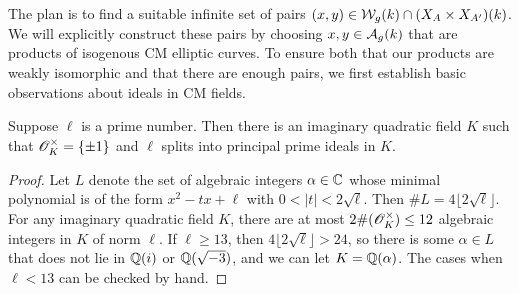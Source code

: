 \documentclass{amsart}
\begin{document}
The plan is to find a suitable infinite set of pairs $(x,y) \in \mathcal{W}_g(k) \cap (X_A \times X_{A'})(k)$. We will explicitly construct these pairs by choosing $x,y \in \mathcal{A}_g(k)$ that are products of isogenous CM elliptic curves. To ensure both that our products are weakly isomorphic and that there are enough pairs, we first establish basic observations about ideals in CM fields.
\begin{lemma}\label{lem:silly}
  Suppose $\ell$ is a prime number. Then there is an imaginary quadratic field $K$ such that $\mathscr{O}_K^\times = \{\pm 1\}$ and $\ell$ splits into principal prime ideals in $K$.
\end{lemma}
\begin{proof}
  Let $L$ denote the set of algebraic integers $\alpha \in \mathbb{C}$ whose minimal polynomial is of the form $x^2 - tx + \ell$ with $0 < |t| < 2\sqrt{\ell}$.
  Then $\#L = 4\lfloor 2\sqrt{\ell} \rfloor$.
  For any imaginary quadratic field $K$, there are at most $2\#(\mathscr{O}_K^\times) \leq 12$ algebraic integers in $K$ of norm $\ell$.
  If $\ell \geq 13$, then $4\lfloor 2\sqrt{\ell} \rfloor > 24$, so there is some $\alpha \in L$ that does not lie in $\mathbb{Q}(i)$ or $\mathbb{Q}(\sqrt{-3})$, and we can let
   $K = \mathbb{Q}(\alpha)$.
  The cases when $\ell < 13$ can be checked by hand.
\end{proof}
\end{document}
